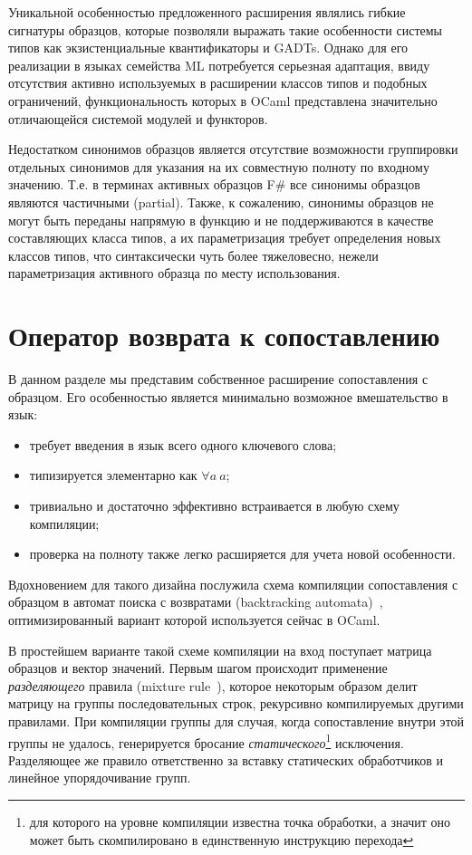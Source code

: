 Уникальной особенностью предложенного расширения являлись гибкие сигнатуры образцов, которые позволяли выражать такие особенности системы типов как экзистенциальные квантификаторы и GADTs. Однако для его реализации в языках семейства ML потребуется серьезная адаптация, ввиду отсутствия активно используемых в расширении классов типов и подобных ограничений, функциональность которых в OCaml представлена значительно отличающейся системой модулей и функторов.

Недостатком синонимов образцов является отсутствие возможности группировки отдельных синонимов для указания на их совместную полноту по входному значению. Т.е. в терминах активных образцов F\# все синонимы образцов являются частичными (partial). Также, к сожалению, синонимы образцов не могут быть переданы напрямую в функцию и не поддерживаются в качестве составляющих класса типов, а их параметризация требует определения новых классов типов, что синтаксически чуть более тяжеловесно, нежели параметризация активного образца по месту использования.

\section{Оператор возврата к сопоставлению} \label{sec:generalized_backtracking}

В данном разделе мы представим собственное расширение сопоставления с образцом. Его особенностью является минимально возможное вмешательство в язык:

\begin{itemize}
\item требует введения в язык всего одного ключевого слова;
\item типизируется элементарно как $\forall a\ a$;
\item тривиально и достаточно эффективно встраивается в любую схему компиляции;
\item проверка на полноту также легко расширяется для учета новой особенности.
\end{itemize}

Вдохновением для такого дизайна послужила схема компиляции сопоставления с образцом в автомат поиска с возвратами (backtracking automata)~\cite{fessant2001optimizing,augustsson1985compiling}, оптимизированный вариант которой используется сейчас в OCaml.

В простейшем варианте такой схеме компиляции на вход поступает матрица образцов и вектор значений. Первым шагом происходит применение \textit{разделяющего} правила (mixture rule~\cite{fessant2001optimizing}), которое некоторым образом делит матрицу на группы последовательных строк, рекурсивно компилируемых другими правилами. При компиляции группы для случая, когда сопоставление внутри этой группы не удалось, генерируется бросание \textit{статического}\footnote{для которого на уровне компиляции известна точка обработки, а значит оно может быть скомпилировано в единственную инструкцию перехода} исключения. Разделяющее же правило ответственно за вставку статических обработчиков и линейное упорядочивание групп.

